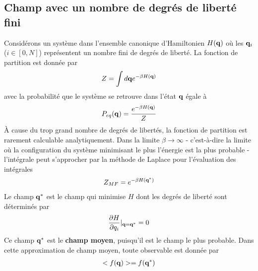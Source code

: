     \subsection{Champ avec un nombre de degrés de liberté fini}
Considérons un système dans l'ensemble canonique d'Hamiltonien  $H({\bf q})$ où les ${\bf q}_i$ ($i \in [0,N]$) représentent un nombre fini de degrés de liberté. La fonction de partition est donnée par 
\begin{align}
    Z = \int d{\bf q} e^{-\beta H({\bf q})}
\end{align}
avec la probabilité que le système se retrouve dans l'état ${\bf q}$ égale à
\begin{align}
    P_{eq}({\bf q}) = \frac{e^{-\beta H({\bf q})}}{Z}
    \label{eqdis}
\end{align}
À cause du trop grand nombre de degrés de libertés, la fonction de partition est rarement calculable analytiquement. Dans la limite $\beta \to \infty$ - c'est-à-dire la limite où la configuration du système minimisant le plus l'énergie est la plus probable - l'intégrale peut s'approcher par la méthode de Laplace pour l'évaluation des intégrales 
\begin{align}
    Z_{MF}= e^{-\beta H({\bf q}^*)}
\end{align}
Le champ ${\bf q}^*$ est le champ qui minimise $H$ dont les degrés de liberté sont déterminés par
\begin{align}
    \frac{\partial H}{\partial q_i}|_{{\bf q}={\bf q^*}}=0
\end{align}
Ce champ ${\bf q}^*$ est le \textbf{champ moyen}, puisqu'il est le champ le plus probable. Dans cette approximation de champ moyen, toute observable est donnée par
\begin{align}
    < f({\bf q}) > = f({\bf q}^*)
\end{align}

